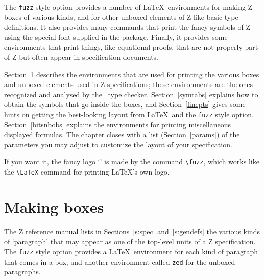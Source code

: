 The \verb/fuzz/ style option provides a number of \LaTeX\
environments for making Z boxes of various kinds, and for other
unboxed elements of Z like basic type definitions.  It also
provides many commands that print the fancy symbols of Z using the
special font supplied in the package.  Finally, it provides some
environments that print things, like equational proofs, that are not
properly part of Z but often appear in specification documents.

Section~\ref{boxes} describes the environments that are used for
printing the various boxes and unboxed elements used in Z
specifications; these environments are the ones recognized and
analysed by the \fuzz\ type checker.  Section~\ref{symtabs}
explains how to obtain the symbols that go inside the boxes, and
Section~\ref{finepts} gives some hints on getting the best-looking
layout from \LaTeX\ and the \verb/fuzz/ style option.
Section~\ref{bitsnbobs} explains the environments for printing
miscellaneous displayed formulas.  The chapter closes with a
list (Section~\ref{params}) of the parameters you may adjust to
customize the layout of your specification.

If you want it, the fancy logo `\fuzz' is made by the command
\verb/\fuzz/, which works like the \verb/\LaTeX/ command for
printing \LaTeX's own logo.

\section{Making boxes}\label{boxes}

The Z reference manual lists 
\ifmanual 
  in Sections~\ref{s:spec} and~\ref{s:gendefs} the 
\fi
various kinds of `paragraph' that may
appear as one of the top-level units of a Z specification.  The
\verb/fuzz/ style option provides a \LaTeX\ environment for each
kind of paragraph that comes in a box, and another environment called
\verb/zed/ for the unboxed paragraphs.

